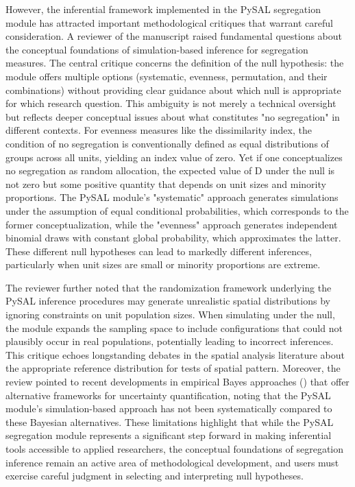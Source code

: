 \documentclass[12pt,a4paper]{article}
\begin{document}
However, the inferential framework implemented in the PySAL segregation module has attracted important methodological critiques that warrant careful consideration. A reviewer of the \cite{cortes2020open} manuscript raised fundamental questions about the conceptual foundations of simulation-based inference for segregation measures. The central critique concerns the definition of the null hypothesis: the module offers multiple options (systematic, evenness, permutation, and their combinations) without providing clear guidance about which null is appropriate for which research question. This ambiguity is not merely a technical oversight but reflects deeper conceptual issues about what constitutes "no segregation" in different contexts. For evenness measures like the dissimilarity index, the condition of no segregation is conventionally defined as equal distributions of groups across all units, yielding an index value of zero. Yet if one conceptualizes no segregation as random allocation, the expected value of D under the null is not zero but some positive quantity that depends on unit sizes and minority proportions. The PySAL module's "systematic" approach generates simulations under the assumption of equal conditional probabilities, which corresponds to the former conceptualization, while the "evenness" approach generates independent binomial draws with constant global probability, which approximates the latter. These different null hypotheses can lead to markedly different inferences, particularly when unit sizes are small or minority proportions are extreme.

The reviewer further noted that the randomization framework underlying the PySAL inference procedures may generate unrealistic spatial distributions by ignoring constraints on unit population sizes. When simulating under the null, the module expands the sampling space to include configurations that could not plausibly occur in real populations, potentially leading to incorrect inferences. This critique echoes longstanding debates in the spatial analysis literature about the appropriate reference distribution for tests of spatial pattern. Moreover, the review pointed to recent developments in empirical Bayes approaches (\cite{lee2015bayesianinference}) that offer alternative frameworks for uncertainty quantification, noting that the PySAL module's simulation-based approach has not been systematically compared to these Bayesian alternatives. These limitations highlight that while the PySAL segregation module represents a significant step forward in making inferential tools accessible to applied researchers, the conceptual foundations of segregation inference remain an active area of methodological development, and users must exercise careful judgment in selecting and interpreting null hypotheses.
\end{document}
